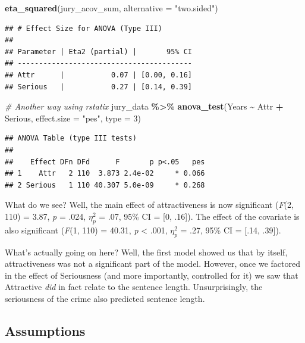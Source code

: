 \documentclass[
]{book}
\newenvironment{Shaded}{\begin{snugshade}}{\end{snugshade}}
\newcommand{\AttributeTok}[1]{\textcolor[rgb]{0.13,0.29,0.53}{#1}}
\newcommand{\CommentTok}[1]{\textcolor[rgb]{0.56,0.35,0.01}{\textit{#1}}}
\newcommand{\DecValTok}[1]{\textcolor[rgb]{0.00,0.00,0.81}{#1}}
\newcommand{\FunctionTok}[1]{\textcolor[rgb]{0.13,0.29,0.53}{\textbf{#1}}}
\newcommand{\NormalTok}[1]{#1}
\newcommand{\SpecialCharTok}[1]{\textcolor[rgb]{0.81,0.36,0.00}{\textbf{#1}}}
\newcommand{\StringTok}[1]{\textcolor[rgb]{0.31,0.60,0.02}{#1}}
\begin{document}
\begin{Shaded}
\begin{Highlighting}[]
\FunctionTok{eta\_squared}\NormalTok{(jury\_acov\_sum, }\AttributeTok{alternative =} \StringTok{"two.sided"}\NormalTok{)}
\end{Highlighting}
\end{Shaded}

\begin{verbatim}
## # Effect Size for ANOVA (Type III)
## 
## Parameter | Eta2 (partial) |       95% CI
## -----------------------------------------
## Attr      |           0.07 | [0.00, 0.16]
## Serious   |           0.27 | [0.14, 0.39]
\end{verbatim}

\begin{Shaded}
\begin{Highlighting}[]
\CommentTok{\# Another way using rstatix}
\NormalTok{jury\_data }\SpecialCharTok{\%\textgreater{}\%}
  \FunctionTok{anova\_test}\NormalTok{(Years }\SpecialCharTok{\textasciitilde{}}\NormalTok{ Attr }\SpecialCharTok{+}\NormalTok{ Serious, }\AttributeTok{effect.size =} \StringTok{"pes"}\NormalTok{, }\AttributeTok{type =} \DecValTok{3}\NormalTok{)}
\end{Highlighting}
\end{Shaded}

\begin{verbatim}
## ANOVA Table (type III tests)
## 
##    Effect DFn DFd      F       p p<.05   pes
## 1    Attr   2 110  3.873 2.4e-02     * 0.066
## 2 Serious   1 110 40.307 5.0e-09     * 0.268
\end{verbatim}

What do we see? Well, the main effect of attractiveness is now significant (\emph{F}(2, 110) = 3.87, \emph{p} = .024, \(\eta^2_p\) = .07, 95\% CI = {[}0, .16{]}). The effect of the covariate is also significant (\emph{F}(1, 110) = 40.31, \emph{p} \textless{} .001, \(\eta^2_p\) = .27, 95\% CI = {[}.14, .39{]}).

What's actually going on here? Well, the first model showed us that by itself, attractiveness was not a significant part of the model. However, once we factored in the effect of Seriousness (and more importantly, controlled for it) we saw that Attractive \emph{did} in fact relate to the sentence length. Unsurprisingly, the seriousness of the crime also predicted sentence length.

\subsection{Assumptions}\label{assumptions-2}
\end{document}
